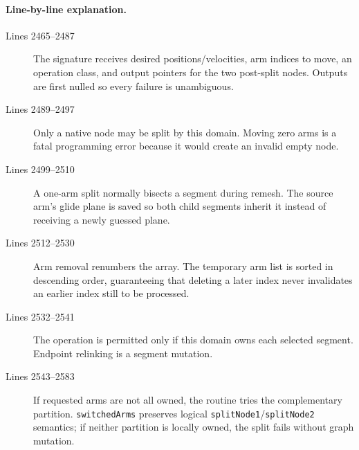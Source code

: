 \documentclass[11pt]{article}
\newcommand{\code}[1]{\texorpdfstring{\nolinkurl{#1}}{#1}}
\begin{document}
\paragraph{Line-by-line explanation.}
\begin{description}
\item[Lines 2465--2487] The signature receives desired positions/velocities,
arm indices to move, an operation class, and output pointers for the two
post-split nodes. Outputs are first nulled so every failure is unambiguous.
\item[Lines 2489--2497] Only a native node may be split by this domain.
Moving zero arms is a fatal programming error because it would create an
invalid empty node.
\item[Lines 2499--2510] A one-arm split normally bisects a segment during
remesh. The source arm's glide plane is saved so both child segments inherit
it instead of receiving a newly guessed plane.
\item[Lines 2512--2530] Arm removal renumbers the array. The temporary arm
list is sorted in descending order, guaranteeing that deleting a later index
never invalidates an earlier index still to be processed.
\item[Lines 2532--2541] The operation is permitted only if this domain owns
each selected segment. Endpoint relinking is a segment mutation.
\item[Lines 2543--2583] If requested arms are not all owned, the routine tries
the complementary partition. \code{switchedArms} preserves logical
\code{splitNode1}/\code{splitNode2} semantics; if neither partition is
locally owned, the split fails without graph mutation.
\end{description}


\end{document}
